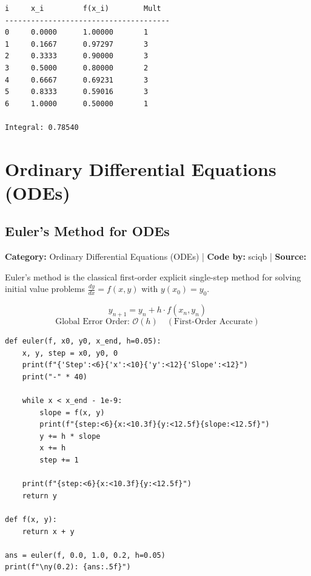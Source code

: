 \documentclass[10pt,a4paper]{report}
\begin{document}
\begin{tcolorbox}[colback=termbg,colframe=primary,title=\textbf{Program Execution Output \& Convergence Table},boxrule=1pt,arc=2mm]
\begin{lstlisting}[style=terminal_output]
i     x_i         f(x_i)        Mult  
--------------------------------------
0     0.0000      1.00000       1     
1     0.1667      0.97297       3     
2     0.3333      0.90000       3     
3     0.5000      0.80000       2     
4     0.6667      0.69231       3     
5     0.8333      0.59016       3     
6     1.0000      0.50000       1     

Integral: 0.78540
\end{lstlisting}
\end{tcolorbox}

\newpage

\chapter{Ordinary Differential Equations (ODEs)}


\section{Euler's Method for ODEs}
\textbf{Category:} \textcolor{secondary}{Ordinary Differential Equations (ODEs)} \quad | \quad \textbf{Code by:} \textcolor{secondary}{sciqb} \quad | \quad \textbf{Source:} \texttt{}

Euler's method is the classical first-order explicit single-step method for solving initial value problems $\frac{dy}{dx} = f(x, y)$ with $y(x_0) = y_0$.

\begin{tcolorbox}[colback=theorybg,colframe=theoryframe,title=\textbf{Mathematical Theory \& Formulation},boxrule=1pt,arc=2mm]
\[
y_{n+1} = y_n + h \cdot f(x_n, y_n)
\]
\[
\text{Global Error Order: } \mathcal{O}(h) \quad (\text{First-Order Accurate})
\]
\end{tcolorbox}

\begin{tcolorbox}[colback=codebg,colframe=secondary,title=\textbf{Python Implementation (Step-by-Step Functions)},boxrule=1pt,arc=2mm]
\begin{lstlisting}[style=python_detailed]
def euler(f, x0, y0, x_end, h=0.05):
    x, y, step = x0, y0, 0
    print(f"{'Step':<6}{'x':<10}{'y':<12}{'Slope':<12}")
    print("-" * 40)

    while x < x_end - 1e-9:
        slope = f(x, y)
        print(f"{step:<6}{x:<10.3f}{y:<12.5f}{slope:<12.5f}")
        y += h * slope
        x += h
        step += 1

    print(f"{step:<6}{x:<10.3f}{y:<12.5f}")
    return y

def f(x, y):
    return x + y

ans = euler(f, 0.0, 1.0, 0.2, h=0.05)
print(f"\ny(0.2): {ans:.5f}")


\end{lstlisting}
\end{tcolorbox}
\end{document}
